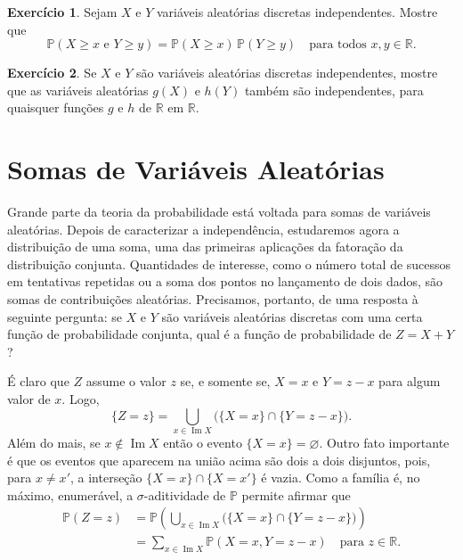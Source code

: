\documentclass[12pt,portuguese]{article}
\theoremstyle{definition}
\newtheorem{exercise}{Exercício}
\let\emptyset\varnothing
\begin{document}
\begin{exercise}\label{exercise:probabilidade-tails}
Sejam $X$ e $Y$ variáveis aleatórias discretas independentes. Mostre que
\[
\mathbb{P}(X \geqslant x \text{ e } Y \geqslant y)
= \mathbb{P}(X \geqslant x)\,\mathbb{P}(Y \geqslant y)
\quad \text{para todos } x, y \in \mathbb{R}.
\]
\end{exercise}

\begin{exercise}\label{exercise:funcoes-independentes}
Se $X$ e $Y$ são variáveis aleatórias discretas independentes, mostre que as
variáveis aleatórias $g(X)$ e $h(Y)$ também são independentes, para quaisquer
funções $g$ e $h$ de $\mathbb{R}$ em $\mathbb{R}$.
\end{exercise}



\section{Somas de Variáveis Aleatórias}
\label{sec:somas}

Grande parte da teoria da probabilidade está voltada para somas de
variáveis aleatórias. Depois de caracterizar a independência, estudaremos
agora a distribuição de uma soma, uma das primeiras aplicações da
fatoração da distribuição conjunta. Quantidades de interesse, como o
número total de sucessos em tentativas repetidas ou a soma dos pontos no
lançamento de dois dados, são somas de contribuições aleatórias. Precisamos, portanto,
de uma resposta à seguinte pergunta: se $X$ e $Y$ são variáveis aleatórias
discretas com uma certa função de probabilidade conjunta, qual é a função
de probabilidade de $Z = X + Y$?

É claro que $Z$ assume o valor $z$ se, e somente se, $X = x$ e
$Y = z - x$ para algum valor de $x$. Logo,
\[
\{Z = z\} = \bigcup_{x \in \operatorname{Im} X}
\bigl( \{X = x\} \cap \{Y = z - x\} \bigr).
\]
Além do mais, se $x \notin \operatorname{Im} X$ então o evento $\{X=x\}=\emptyset$. 
Outro fato importante é que os eventos que aparecem na união acima são
dois a dois disjuntos, pois, para $x \neq x'$, a interseção
$\{X = x\} \cap \{X = x'\}$ é vazia. Como a família é, no máximo,
enumerável, a $\sigma$-aditividade de $\mathbb{P}$ permite afirmar que 
\begin{align}\label{eq-aux1-form-conv}
\mathbb{P}(Z = z)
&= \mathbb{P}\left( \bigcup_{x \in \operatorname{Im} X}
\bigl( \{X = x\} \cap \{Y = z - x\} \bigr) \right) 
\nonumber\\[0.3cm]
&= \sum_{x \in \operatorname{Im} X} \mathbb{P}(X = x, Y = z - x)
\quad \text{para } z \in \mathbb{R}.
\end{align}
\end{document}
